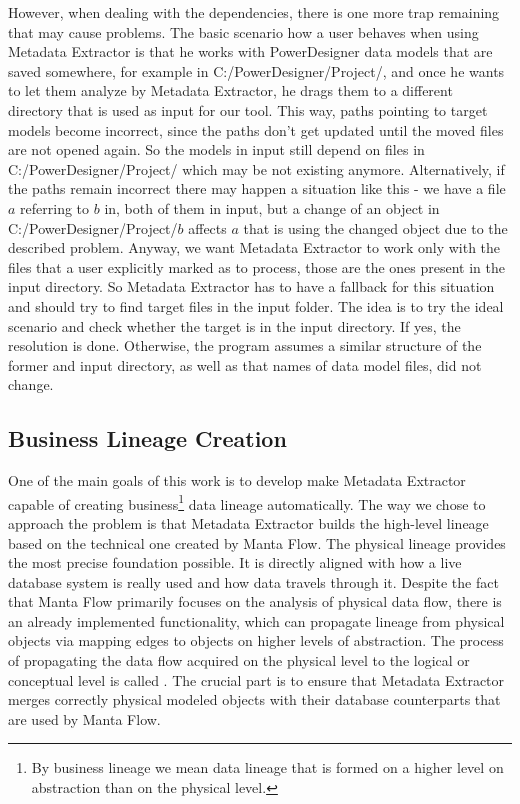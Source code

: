 However, when dealing with the dependencies, there is one more trap remaining that may cause problems. The basic scenario how a user behaves when using Metadata Extractor is that he works with PowerDesigner data models that are saved somewhere, for example in C:/PowerDesigner/Project/, and once he wants to let them analyze by Metadata Extractor, he drags them to a different directory that is used as input for our tool.
This way, paths pointing to target models become incorrect, since the paths don't get updated until the moved files are not opened again. 
So the models in input still depend on files in C:/PowerDesigner/Project/ which may be not existing anymore. Alternatively, if the paths remain incorrect there may happen a situation like this - we have a file $a$ referring to $b$ in, both of them in input, but a change of an object in C:/PowerDesigner/Project/$b$ affects $a$ that is using the changed object due to the described problem.
Anyway, we want Metadata Extractor to work only with the files that a user explicitly marked as to process, those are the ones present in the input directory.
So Metadata Extractor has to have a fallback for this situation and should try to find target files in the input folder.
The idea is to try the ideal scenario and check whether the target is in the input directory. If yes, the resolution is done.
Otherwise, the program assumes a similar structure of the former and input directory, as well as that names of data model files,  did not change.

\subsection{Business Lineage Creation}

One of the main goals of this work is to develop make Metadata Extractor capable of creating business\footnote{By business lineage we mean data lineage that is formed on a higher level on abstraction than on the physical level.} data lineage automatically.
The way we chose to approach the problem is that Metadata Extractor builds the high-level lineage based on the technical one created by Manta Flow. 
The physical lineage provides the most precise foundation possible. 
It is directly aligned with how a live database system is really used and how data travels through it.
Despite the fact that Manta Flow primarily focuses on the analysis of physical data flow, there is an already implemented functionality, which can propagate lineage from physical objects via mapping edges to objects on higher levels of abstraction.
The process of propagating the data flow acquired on the physical level to the logical or conceptual level is called .
The crucial part is to ensure that Metadata Extractor merges correctly physical modeled objects with their database counterparts that are used by Manta Flow.


